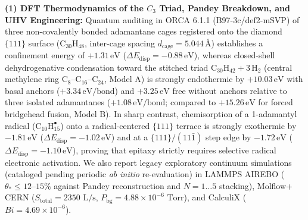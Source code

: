 \documentclass[10pt,twocolumn,a4paper]{article}
\begin{document}
\begin{@twocolumnfalse}
{    \noindent\textbf{(1) DFT Thermodynamics of the $C_3$ Triad, Pandey Breakdown, and UHV Engineering:} Quantum auditing in ORCA 6.1.1 (B97-3c/def2-mSVP) of three non-covalently bonded adamantane cages registered onto the diamond $\{111\}$ surface ($\text{C}_{30}\text{H}_{48}$, inter-cage spacing $d_{\text{cage}} = 5.044\,\text{\AA}$) establishes a confinement energy of $+1.31\,\text{eV}$ ($\Delta E_{\text{disp}} = -0.88\,\text{eV}$), whereas closed-shell dehydrogenative condensation toward the stitched triad $\text{C}_{30}\text{H}_{42} + 3\,\text{H}_2$ (central methylene ring $\text{C}_8\text{--C}_{16}\text{--C}_{24}$, Model A) is strongly endothermic by $\mathbf{+10.03}\,\text{eV}$ with basal anchors ($+3.34\,\text{eV/bond}$) and $\mathbf{+3.25}\,\text{eV}$ free without anchors relative to three isolated adamantanes ($+1.08\,\text{eV/bond}$; compared to $+15.26\,\text{eV}$ for forced bridgehead fusion, Model B). In sharp contrast, chemisorption of a 1-adamantyl radical ($\text{C}_{10}\text{H}_{15}^\bullet$) onto a radical-centered $\{111\}$ terrace is strongly exothermic by $\mathbf{-1.81}\,\text{eV}$ ($\Delta E_{\text{disp}} = -1.02\,\text{eV}$) and at a $\{111\}/(11\bar{1})$ step edge by $\mathbf{-1.72}\,\text{eV}$ ($\Delta E_{\text{disp}} = -1.10\,\text{eV}$), proving that epitaxy strictly requires selective radical electronic activation. We also report legacy exploratory continuum simulations (cataloged pending periodic \textit{ab initio} re-evaluation) in LAMMPS AIREBO ($\theta_* \le 12\text{--}15\%$ against Pandey reconstruction and $N=1\dots5$ stacking), Molflow+ CERN ($S_{\text{total}} = 2350\text{ L/s}$, $P_{\text{bg}} = 4.88 \times 10^{-6}\text{ Torr}$), and CalculiX ($Bi = 4.69 \times 10^{-6}$).

}
\end{@twocolumnfalse}
\end{document}
